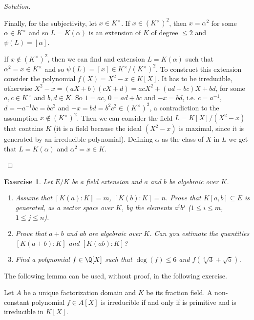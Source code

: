 \documentclass[a4paper,10pt,reqno]{amsart}
\newtheorem{ex}{Exercise}[section]
\newenvironment{sol}
  {\renewcommand\qedsymbol{$\blacksquare$}\begin{proof}[Solution]}
  {\end{proof}}
\begin{document}
\begin{sol}
\begin{enumerate}[label=(\roman*)]
        Finally, for the subjectivity, let $x\in K^\times$.
        If $x\in (K^\times)^2$, then $x=\alpha^2$ for some $\alpha\in K^\times$
        and so $L=K(\alpha)$ is an extension of $K$ of degree $\leq 2$ 
        and $\psi(L)=[\alpha]$.

        If $x\not\in (K^\times)^2$, then we can find and extension $L=K(\alpha)$ such that
        $\alpha^2=x\in K^\times$ and so $\psi(L)=[x]\in K^\times/(K^\times)^2$.
        To construct this extension consider the polynomial $f(X)=X^2-x\in K[X]$.
        It has to be irreducible, otherwise $X^2-x=(aX+b)(cX+d)=acX^2+(ad+bc)X+bd$, for some
        $a,c\in K^\times$ and $b,d\in K$.
        So $1=ac$, $0=ad+bc$ and $-x=bd$, i.e. $c=a^{-1}$, $d=-a^{-1}bc=bc^2$ and $-x=bd=b^2c^2\in (K^\times)^2$, a contradiction to the assumption $x\not\in (K^\times)^2$.
        Then we can consider the field $L=K[X]/(X^2-x)$ that contains $K$
        (it is a field because the ideal $(X^2-x)$ is maximal,
        since it is generated by an irreducible polynomial).
        Defining $\alpha$ as the class of $X$ in $L$ 
        we get that $L=K(\alpha)$ and $\alpha^2=x\in K$.        
    \end{enumerate}    
\end{sol}

\begin{ex}
    Let $E/K$ be a field extension and 
    $a$ and $b$ be algebraic over $K$.

    \begin{enumerate}
        \item Assume that $[K(a):K] = m$, $[K(b):K] = n$. Prove that $K[a,b] \subseteq E$ is generated, as a vector space over $K$, by the elements $a^ib^j$ ($1 \leq i \leq m$, $1 \leq j \leq n$).
        \item Prove that $a+b$ and $ab$ are algebraic over $K$. Can you estimate the quantities $[K(a+b):K]$ and $[K(ab):K]$?
        \item Find a polynomial $f \in \Q[X]$ such that $\deg(f) \leq 6$ and $f(\sqrt[3]{3} + \sqrt{5})$.
    \end{enumerate}
\end{ex}

The following lemma can be used, without proof, in the following exercise.

\begin{lem*}
    Let $A$ be a unique factorization domain and $K$ be its fraction field.
    A non-constant polynomial $f\in A[X]$ is irreducible if and only if is primitive and is irreducible in $K[X]$.
\end{lem*}
\end{document}
